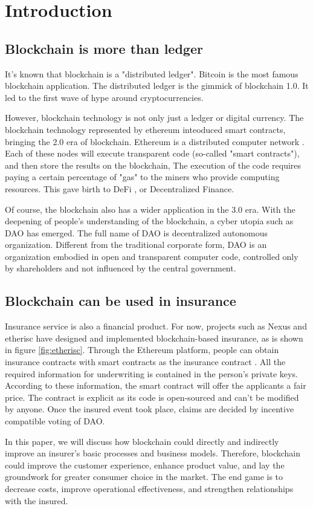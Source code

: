 \section{Introduction}

\subsection{Blockchain is more than ledger}
It's known that blockchain is a "distributed ledger".
Bitcoin is the most famous blockchain application.
The distributed ledger is the gimmick of blockchain 1.0.
It led to the first wave of hype around cryptocurrencies.

However, blockchain technology is not only just a ledger or digital currency.
The blockchain technology represented by ethereum inteoduced smart contracts, bringing the 2.0 era of blockchain.
Ethereum is a distributed computer network \autocite{ethereum2014ethereum}.
Each of these nodes will execute transparent code (so-called "smart contracts"), and then store the results on the blockchain,
The execution of the code requires paying a certain percentage of "gas" to the miners who provide computing resources.
This gave birth to DeFi \autocite{chen2020blockchain}, or Decentralized Finance.

Of course, the blockchain also has a wider application in the 3.0 era.
With the deepening of people's understanding of the blockchain, a cyber utopia such as DAO \autocite{wang2019decentralized} has emerged.
The full name of DAO is decentralized autonomous organization.
Different from the traditional corporate form,
DAO is an organization embodied in open and transparent computer code,
controlled only by shareholders and not influenced by the central government.

\subsection{Blockchain can be used in insurance}
Insurance service is also a financial product.
For now, projects such as Nexus and etherisc have designed and implemented blockchain-based insurance, as is shown in figure \ref{fig:etherisc}.
Through the Ethereum platform, people can obtain insurance contracts with smart contracts as the insurance contract \autocite{wan2018pride}.
All the required information for underwriting is contained in the person's private keys.
According to these information, the smart contract will offer the applicants a fair price.
The contract is explicit as its code is open-sourced and can't be modified by anyone.
Once the insured event took place, claims are decided by incentive compatible voting of DAO.

In this paper, we will discuss how blockchain could directly and indirectly improve an insurer’s basic processes and business models.
Therefore, blockchain could improve the customer experience, enhance product value, and lay the groundwork for greater consumer choice in the market.
The end game is to decrease costs, improve operational effectiveness, and strengthen relationships with the insured.
